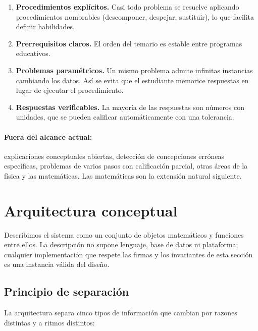 \documentclass[11pt]{article}
\theoremstyle{definition}
\theoremstyle{remark}
\begin{document}
\begin{enumerate}
\item \textbf{Procedimientos explícitos.} Casi todo problema se resuelve aplicando procedimientos nombrables (descomponer, despejar, sustituir), lo que facilita definir habilidades.
\item \textbf{Prerrequisitos claros.} El orden del temario es estable entre programas educativos.
\item \textbf{Problemas paramétricos.} Un mismo problema admite infinitas instancias cambiando los datos. Así se evita que el estudiante memorice respuestas en lugar de ejecutar el procedimiento.
\item \textbf{Respuestas verificables.} La mayoría de las respuestas son números con unidades, que se pueden calificar automáticamente con una tolerancia.
\end{enumerate}

\paragraph{Fuera del alcance actual:} explicaciones conceptuales abiertas, detección de concepciones erróneas específicas, problemas de varios pasos con calificación parcial, otras áreas de la física y las matemáticas. Las matemáticas son la extensión natural siguiente.

\section{Arquitectura conceptual}
\label{sec:arquitectura}

Describimos el sistema como un conjunto de objetos matemáticos y funciones entre ellos. La descripción no supone lenguaje, base de datos ni plataforma; cualquier implementación que respete las firmas y los invariantes de esta sección es una instancia válida del diseño.

\subsection{Principio de separación}

La arquitectura separa cinco tipos de información que cambian por razones distintas y a ritmos distintos:
\end{document}
